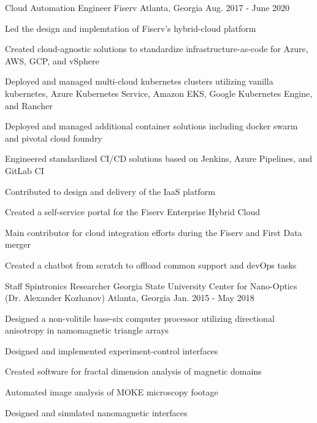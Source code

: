 \begin{cventries}

\cventry
{Cloud Automation Engineer} %
{Fiserv} %
{Atlanta, Georgia} %
{Aug. 2017 - June 2020} %
{ %
\begin{cvitems}
\item {Led the design and implemtation of Fiserv's hybrid-cloud platform}
\item {Created cloud-agnostic solutions to standardize infrastructure-as-code for Azure, AWS, GCP, and vSphere}
\item {Deployed and managed multi-cloud kubernetes clusters utilizing vanilla kubernetes, Azure Kubernetes Service, Amazon EKS, Google Kubernetes Engine, and Rancher}
\item {Deployed and managed additional container solutions including docker swarm and pivotal cloud foundry}
\item {Engineered standardized CI/CD solutions based on Jenkins, Azure Pipelines, and GitLab CI}
\item {Contributed to design and delivery of the IaaS platform}
\item {Created a self-service portal for the Fiserv Enterprise Hybrid Cloud}
\item {Main contributor for cloud integration efforts during the Fiserv and First Data merger}
\item {Created a chatbot from scratch to offload common support and devOps tasks}
\end{cvitems}
}


\cventry
{Staff Spintronics Researcher} %
{Georgia State University Center for Nano-Optics (Dr. Alexander Kozhanov)} %
{Atlanta, Georgia} %
{Jan. 2015 - May 2018} %
{ %
\begin{cvitems}
\item {Designed a non-volitile base-six computer processor utilizing directional anisotropy in namomagnetic \newline triangle arrays}
\item {Designed and implemented experiment-control interfaces}
\item {Created software for fractal dimension analysis of magnetic domains}
\item {Automated image analysis of MOKE microscopy footage}
\item {Designed and simulated nanomagnetic interfaces}
\end{cvitems} 
}


\end{cventries}
